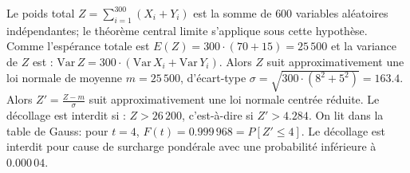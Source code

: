 {\begin{enumerate}
{Le poids total $Z=\sum_{i=1}^{300}(X_{i}+Y_{i})$ est la somme de $600$
variables aléatoires indépendantes; le théorème central
limite s'applique sous cette hypothèse.
Comme l'espérance totale est $E(Z)=300 \cdot (70+15)=25\,500$ et la variance
de $Z$ est :
$\text{Var}\, Z=300 \cdot(\text{Var}\,X_{i}+\text{Var}\,Y_{i})$.
 Alors $Z$ suit approximativement une loi
normale de moyenne $m=25\,500$, d'écart-type $\sigma =\sqrt{300\cdot(8^{2}+5^{2})}=163.4$.
Alors $Z' =\frac{Z-m}{\sigma}$ suit approximativement une loi normale
centrée réduite.
Le décollage est interdit si : $Z>26\,200$, c'est-à-dire si  $Z' >4.284$.
On lit dans la table de Gauss: pour $t=4$, $F(t)=0.999\,968=P[Z' \leq 4]$.
Le décollage est interdit pour cause de surcharge pondérale avec une
probabilité inférieure à $0.000\,04$.}
\end{enumerate}
}
